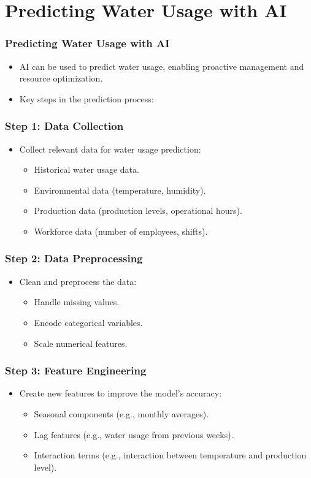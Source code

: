 \documentclass{beamer}
\begin{document}
\section{Predicting Water Usage with AI}

\begin{frame}
\frametitle{Predicting Water Usage with AI}
\begin{itemize}
    \item AI can be used to predict water usage, enabling proactive management and resource optimization.
    \item Key steps in the prediction process:
\end{itemize}
\end{frame}

\begin{frame}
\frametitle{Step 1: Data Collection}
\begin{itemize}
    \item Collect relevant data for water usage prediction:
        \begin{itemize}
            \item Historical water usage data.
            \item Environmental data (temperature, humidity).
            \item Production data (production levels, operational hours).
            \item Workforce data (number of employees, shifts).
        \end{itemize}
\end{itemize}
\end{frame}

\begin{frame}
\frametitle{Step 2: Data Preprocessing}
\begin{itemize}
    \item Clean and preprocess the data:
        \begin{itemize}
            \item Handle missing values.
            \item Encode categorical variables.
            \item Scale numerical features.
        \end{itemize}
\end{itemize}
\end{frame}

\begin{frame}
\frametitle{Step 3: Feature Engineering}
\begin{itemize}
    \item Create new features to improve the model's accuracy:
        \begin{itemize}
            \item Seasonal components (e.g., monthly averages).
            \item Lag features (e.g., water usage from previous weeks).
            \item Interaction terms (e.g., interaction between temperature and production level).
        \end{itemize}
\end{itemize}
\end{frame}
\end{document}
